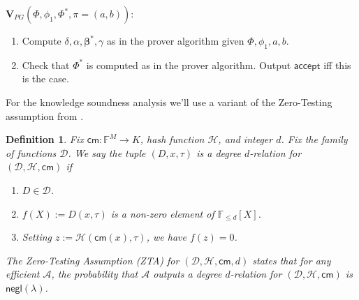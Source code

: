 \documentclass[11pt]{article} %
\newcommand{\F}{\ensuremath{\mathbb F}\xspace}
\newcommand{\adv}{\ensuremath{\mathcal A}\xspace}
\newcommand{\cm}{\ensuremath{\mathsf{cm}}\xspace}
\newcommand{\negl}{\ensuremath{\mathsf{negl}(\lambda)}\xspace}
\newcommand{\acc}{\ensuremath{\mathsf{accept}}\xspace}
\newcommand{\defeq}{:=}
\newcommand{\hash}{\ensuremath{\mathcal{H}}\xspace}
\newcommand{\inst}{\ensuremath{\phi}\xspace}
\newcommand{\ver}{\ensuremath{\mathsf{\mathbf{V}}}\xspace}
\newcommand{\polysofdegeq}[1]{\ensuremath{\F_{\leq #1}[X]}\xspace}
\newtheorem{dfn}[lemma]{Definition}
\newcommand{\betaa}{\ensuremath{\mathbf{\boldsymbol{\beta}}}\xspace}
\newcommand{\instt}{\ensuremath{\Phi^*}\xspace}
\newcommand{\insttbase}{\ensuremath{\Phi}\xspace}
\newcommand{\ztafuncs}{\ensuremath{\mathcal{D}}\xspace}
\begin{document}
\noindent
\underline{$\ver_{PG}(\insttbase,\inst_1, \instt,\pi=(a,b)):$}\noindent
\begin{enumerate}
 \item Compute $\delta,\alpha,\betaa^*, \gamma$ as in the prover algorithm given $\insttbase,\inst_1,a,b$.

\item Check that $\instt$ is computed as in the prover algorithm. Output \acc iff this is the case. 
\end{enumerate}



For the knowledge soundness analysis we'll use a variant of the Zero-Testing assumption from \cite{novarecursive}.

\begin{dfn}\label{dfn:ZTA}
Fix $\cm:\F^M\to K$, hash function \hash, and integer $d$. Fix the family of functions \ztafuncs. 
We say the tuple $(D,x,\tau)$ is a \emph{degree $d$-relation for $(\ztafuncs,\hash,\cm)$} if
\begin{enumerate}
 \item $D\in \ztafuncs$.
 \item $f(X)\defeq D(x,\tau)$ is a non-zero element of \polysofdegeq{d}.
 \item Setting $z\defeq \hash(\cm(x),\tau)$, we have $f(z)=0$.
\end{enumerate}

The Zero-Testing Assumption (ZTA) for $(\ztafuncs,\hash,\cm,d)$ states that for any efficient \adv, the probability that 
\adv outputs a degree $d$-relation for $(\ztafuncs,\hash,\cm)$ is \negl.
\end{dfn}
\end{document}
